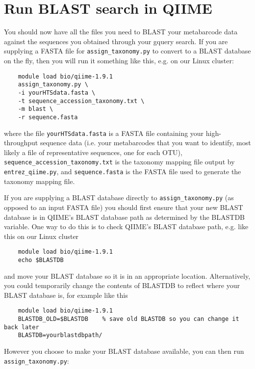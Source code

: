 \documentclass[11pt]{amsart}
\begin{document}
\section{Run BLAST search in QIIME}
\label{section:qiime}

You should now have all the files you need to BLAST your metabarcode data against the sequences you obtained through your gquery search. If you are supplying a FASTA file for \verb|assign_taxonomy.py| to convert to a BLAST database on the fly, then you will run it something like this, e.g. on our Linux cluster:

\begin{verbatim}
    module load bio/qiime-1.9.1
    assign_taxonomy.py \
    -i yourHTSdata.fasta \
    -t sequence_accession_taxonomy.txt \
    -m blast \
    -r sequence.fasta
\end{verbatim}

where the file \verb|yourHTSdata.fasta| is a FASTA file containing your high-throughput sequence data (i.e. your metabarcodes that you want to identify, most likely a file of representative sequences, one for each OTU), \verb|sequence_accession_taxonomy.txt| is the taxonomy mapping file output by \verb|entrez_qiime.py|, and \verb|sequence.fasta| is the FASTA file used to generate the taxonomy mapping file.

If you are supplying a BLAST database directly to \verb|assign_taxonomy.py| (as opposed to an input FASTA file) you should first ensure that your new BLAST database is in QIIME's BLAST database path as determined by the BLASTDB variable. One way to do this is to check QIIME's BLAST database path, e.g. like this on our Linux cluster

\begin{verbatim}
    module load bio/qiime-1.9.1
    echo $BLASTDB
\end{verbatim}

and move your BLAST database so it is in an appropriate location. Alternatively, you could temporarily change the contents of BLASTDB to reflect where your BLAST database is, for example like this

\begin{verbatim}
    module load bio/qiime-1.9.1
    BLASTDB_OLD=$BLASTDB    % save old BLASTDB so you can change it back later
    BLASTDB=yourblastdbpath/
\end{verbatim}

However you choose to make your BLAST database available, you can then run \verb|assign_taxonomy.py|:
\end{document}
